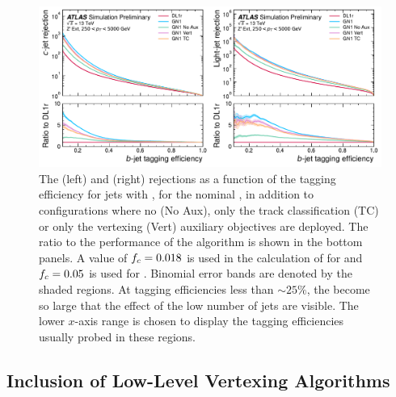 \begin{figure}[!p]
    \centering
    \includegraphics[width=\textwidth]{chapters/gnn_tagger/figs/results/ablations/zprime/zprime_roc_btag.pdf}
    \caption{The \cjet (left) and \ljet (right) rejections as a function of the \bjet tagging efficiency for \Zprime jets with \Zprimept, for the nominal \GNN, in addition to configurations where no (\GNN No Aux), only the track classification (\GNN TC) or only the vertexing (\GNN Vert) auxiliary objectives are deployed. The ratio to the performance of the \DLr algorithm is shown in the bottom panels. A value of $f_c = 0.018$ is used in the calculation of \Db for \DLr and $f_c = 0.05$ is used for \GNN. Binomial error bands are denoted by the shaded regions. At \bjet tagging efficiencies less than $\sim25\%$, the \lrej become so large that the effect of the low number of jets are visible. The lower $x$-axis range is chosen to display the \bjet tagging efficiencies usually probed in these regions.}
    \label{fig:zprime_btag_roc_ab}
\end{figure}



\subsection{Inclusion of Low-Level Vertexing Algorithms}\label{sec:gnn_low_level_vert_impact}

